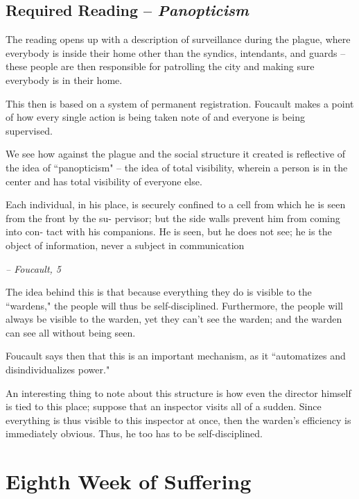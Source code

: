 \documentclass[openany]{book}
\begin{document}
\section{Required Reading -- \textit{Panopticism}}
The reading opens up with a description of surveillance during the plague, where everybody is inside their home other than the syndics, intendants, and guards -- these people are then responsible for patrolling the city and making sure everybody is in their home.

This then is based on a system of permanent registration. Foucault makes a point of how every single action is being taken note of and everyone is being supervised.

We see how against the plague and the social structure it created is reflective of the idea of ``panopticism" -- the idea of total visibility, wherein a person is in the center and has total visibility of everyone else.

\begin{fancyquotes}
	Each individual, in his place, is securely
	confined to a cell from which he is seen from the front by the su-
	pervisor; but the side walls prevent him from coming into con-
	tact with his companions. He is seen, but he does not see; he is
	the object of information, never a subject in communication
	
	\begin{flushright}
		\emph{\textit{-- Foucault, 5}}
	\end{flushright}
\end{fancyquotes}

The idea behind this is that because everything they do is visible to the ``wardens," the people will thus be self-disciplined. Furthermore, the people will always be visible to the warden, yet they can't see the warden; and the warden can see all without being seen.

Foucault says then that this is an important mechanism, as it ``automatizes and disindividualizes power." 

An interesting thing to note about this structure is how even the director himself is tied to this place; suppose that an inspector visits all of a sudden. Since everything is thus visible to this inspector at once, then the warden's efficiency is immediately obvious. Thus, he too has to be self-disciplined.

\chapter{Eighth Week of Suffering}
\end{document}
